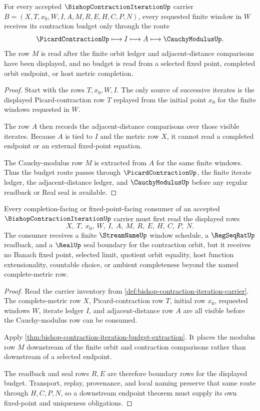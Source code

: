 \begin{theorem}\label{thm:bishop-contraction-iteration-budget-extraction}
For every accepted $\BishopContractionIterationUp$ carrier $B=(X,T,x_0,W,I,A,M,R,E,H,C,P,N)$, every requested finite window in $W$ receives its contraction budget only through the route
$$
\PicardContractionUp \longmapsto I \longmapsto A \longmapsto \CauchyModulusUp .
$$
The row $M$ is read after the finite orbit ledger and adjacent-distance comparisons have been displayed, and no budget is read from a selected fixed point, completed orbit endpoint, or host metric completion.
\end{theorem}
\begin{proof}
Start with the rows $T,x_0,W,I$. The only source of successive iterates is the displayed Picard-contraction row $T$ replayed from the initial point $x_0$ for the finite windows requested in $W$.

The row $A$ then records the adjacent-distance comparisons over those visible iterates. Because $A$ is tied to $I$ and the metric row $X$, it cannot read a completed endpoint or an external fixed-point equation.

The Cauchy-modulus row $M$ is extracted from $A$ for the same finite windows. Thus the budget route passes through $\PicardContractionUp$, the finite iterate ledger, the adjacent-distance ledger, and $\CauchyModulusUp$ before any regular readback or Real seal is available.
\end{proof}

\begin{theorem}\label{thm:bishop-contraction-iteration-completion-boundary}
Every completion-facing or fixed-point-facing consumer of an accepted $\BishopContractionIterationUp$ carrier must first read the displayed rows
$$
X,\ T,\ x_0,\ W,\ I,\ A,\ M,\ R,\ E,\ H,\ C,\ P,\ N .
$$
The consumer receives a finite $\StreamNameUp$ window schedule, a $\RegSeqRatUp$ readback, and a $\RealUp$ seal boundary for the contraction orbit, but it receives no Banach fixed point, selected limit, quotient orbit equality, host function extensionality, countable choice, or ambient completeness beyond the named complete-metric row.
\end{theorem}
\begin{proof}
Read the carrier inventory from \autoref{def:bishop-contraction-iteration-carrier}. The complete-metric row $X$, Picard-contraction row $T$, initial row $x_0$, requested windows $W$, iterate ledger $I$, and adjacent-distance row $A$ are all visible before the Cauchy-modulus row can be consumed.

Apply \autoref{thm:bishop-contraction-iteration-budget-extraction}. It places the modulus row $M$ downstream of the finite orbit and contraction comparisons rather than downstream of a selected endpoint.

The readback and seal rows $R,E$ are therefore boundary rows for the displayed budget. Transport, replay, provenance, and local naming preserve that same route through $H,C,P,N$, so a downstream endpoint theorem must supply its own fixed-point and uniqueness obligations.
\end{proof}

